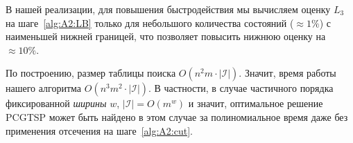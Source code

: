 В нашей реализации,
для повышения быстродействия
мы вычисляем оценку $L_3$ 
на шаге~\ref{alg:A2:LB}
только для небольшого количества состояний
($\approx 1\%$)
с наименьшей нижней границей,
что позволяет повысить нижнюю оценку на
$\approx 10\%$.

По построению,
размер таблицы поиска
$O(n^2m\cdot |\mathcal I|)$. 
Значит, время работы нашего алгоритма
$O(n^3m^2\cdot |\mathcal I|)$. 
В частности, 
в случае частичного порядка фиксированной {\it ширины}
$w$, $|\mathcal I|=O(m^w)$
и значит,
оптимальное решение 
PCGTSP 
может быть найдено в этом случае за полиномиальное время
даже без применения отсечения на шаге~\ref{alg:A2:cut}.

